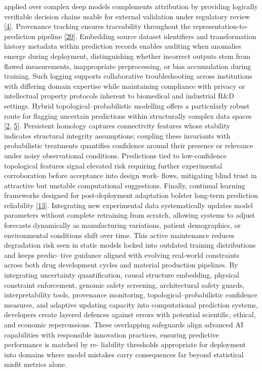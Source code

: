 \documentclass[
]{article}
\begin{document}
applied over complex deep models complements attribution by providing
logically verifiable decision chains usable for external validation
under regulatory review {[}\protect\hyperlink{_bookmark44}{4}{]}.
Provenance tracking ensures traceability throughout the
representation-to-prediction pipeline
{[}\protect\hyperlink{_bookmark60}{20}{]}. Embedding source dataset
identifiers and transformation history metadata within prediction
records enables auditing when anomalies emerge during deployment,
distinguishing whether incorrect outputs stem from flawed measurements,
inappropriate preprocessing, or bias accumulation during training. Such
logging supports collaborative troubleshooting across institutions with
differing domain expertise while maintaining compliance with privacy or
intellectual property protocols inherent to biomedical and industrial
R\&D settings. Hybrid topological--probabilistic modelling offers a
particularly robust route for flagging uncertain predictions within
structurally complex data spaces {[}\protect\hyperlink{_bookmark42}{2},
\protect\hyperlink{_bookmark45}{5}{]}. Persistent homology captures
connectivity features whose stability indicates structural integrity
assumptions; coupling these invariants with probabilistic treatments
quantifies confidence around their presence or relevance under noisy
observational conditions. Predictions tied to low-confidence topological
features signal elevated risk requiring further experimental
corroboration before acceptance into design work- flows, mitigating
blind trust in attractive but unstable computational suggestions.
Finally, continual learning frameworks designed for post-deployment
adaptation bolster long-term prediction reliability
{[}\protect\hyperlink{_bookmark53}{13}{]}. Integrating new experimental
data systematically updates model parameters without complete retraining
from scratch, allowing systems to adjust forecasts dynamically as
manufacturing variations, patient demographics, or environmental
conditions shift over time. This active maintenance reduces degradation
risk seen in static models locked into outdated training distributions
and keeps predic- tive guidance aligned with evolving real-world
constraints across both drug development cycles and material production
pipelines. By integrating uncertainty quantification, causal structure
embedding, physical constraint enforcement, genomic safety screening,
architectural safety guards, interpretability tools, provenance
monitoring, topological--probabilistic confidence measures, and adaptive
updating capacity into computational prediction systems, developers
create layered defences against errors with potential scientific,
ethical, and economic repercussions. These overlapping safeguards align
advanced AI capabilities with responsible innovation practices, ensuring
predictive performance is matched by re- liability thresholds
appropriate for deployment into domains where model mistakes carry
consequences far beyond statistical misfit metrics alone.
\end{document}
